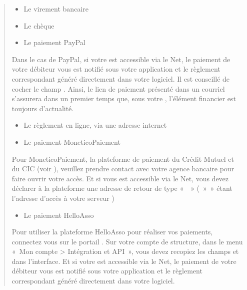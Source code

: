 \documentclass[a4paper,10pt,oneside,french]{sphinxmanual}
\begin{document}
\begin{quote}
\begin{itemize}
\item {} 
\sphinxAtStartPar
Le virement bancaire

\item {} 
\sphinxAtStartPar
Le chèque

\item {} 
\sphinxAtStartPar
Le paiement PayPal

\end{itemize}

\sphinxAtStartPar
Dans le cas de PayPal, si votre  est accessible via le Net, le paiement de votre débiteur vous est notifié sous votre application et le règlement correspondant généré directement dans votre logiciel.
Il est conseillé de cocher le champ . Ainsi, le lien de paiement présenté dans un courriel s’assurera dans un premier temps que, sous votre , l’élément financier est toujours d’actualité.
\begin{itemize}
\item {} 
\sphinxAtStartPar
Le règlement en ligne, via une adresse internet

\item {} 
\sphinxAtStartPar
Le paiement MoneticoPaiement

\end{itemize}

\sphinxAtStartPar
Pour MoneticoPaiement, la plateforme de paiement du Crédit Mutuel et du CIC (voir ), veuillez prendre contact avec votre agence bancaire pour faire ouvrir votre accès.
Et si vous  est accessible via le Net, vous devez déclarer à la plateforme une adresse de retour de type «  » ( » » étant l’adresse d’accès à votre serveur )
\begin{itemize}
\item {} 
\sphinxAtStartPar
Le paiement Hello\sphinxhyphen{}Asso

\end{itemize}

\sphinxAtStartPar
Pour utiliser la plateforme Hello\sphinxhyphen{}Asso pour réaliser vos paiements, connectez vous sur le portail .
Sur votre compte de structure, dans le menu « Mon compte \textgreater{} Intégration et API », vous devez recopiez les champs  et  dans l’interface.
Et si votre  est accessible via le Net, le paiement de votre débiteur vous est notifié sous votre application et le règlement correspondant généré directement dans votre logiciel.
\end{quote}
\end{document}
